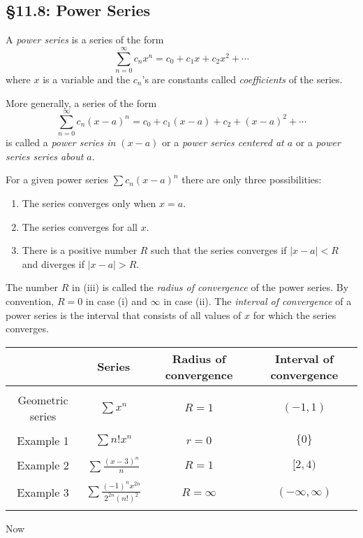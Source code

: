 \subsection*{\S 11.8: Power Series}
\begin{definition}
A \emph{power series} is a series of the form
\[
\sum_{n=0}^\infty c_nx^n=c_0+c_1x+c_2x^2+\dotsb
\]
where $x$ is a variable and the $c_n$'s are constants called
\emph{coefficients} of the series.
\end{definition}
\begin{definition}
More generally, a series of the form
\[
\sum_{n=0}^\infty c_n(x-a)^n=c_0+c_1(x-a)+c_2+(x-a)^2+\dotsb
\]
is called a \emph{power series in $(x-a)$} or a \emph{power series centered
at $a$} or a \emph{power series series about $a$}.
\end{definition}
\begin{theorem}
For a given power series $\sum c_n(x-a)^n$ there are only three
possibilities:
\begin{enumerate}[label=\textnormal{(\roman*)},noitemsep]
\item The series converges only when $x=a$.
\item The series converges for all $x$.
\item There is a positive number $R$ such that the series converges if
  $|x-a|<R$ and diverges if $|x-a|>R$.
\end{enumerate}
\end{theorem}
The number $R$ in (iii) is called the \emph{radius of convergence} of the
power series. By convention, $R=0$ in case (i) and $\infty$ in case (ii).
The \emph{interval of convergence} of a power series is the interval that
consists of all values of $x$ for which the series converges.
\begin{center}
\begin{tabular}{|c|c|c|c|}
\hline
&Series&Radius of convergence&Interval of convergence\\
\hline
&&&\\
Geometric series&$\displaystyle\sum x^n$&$R=1$&$(-1,1)$\\&&&\\
Example 1&$\displaystyle\sum n!x^n$&$r=0$&$\{0\}$\\&&&\\
Example 2&$\displaystyle\sum\frac{(x-3)^n}{n}$&$R=1$&$[2,4)$\\&&&\\
Example
  3&$\displaystyle\sum\frac{(-1)^nx^{2n}}{2^{2n}(n!)^2}$&$R=\infty$&$(-\infty,\infty)$\\
&&&\\
\hline
\end{tabular}
\end{center}
Now
\newpage
